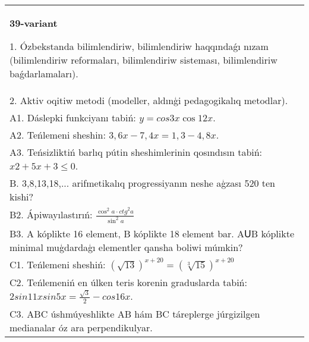 \documentclass{article}
\begin{document}
\begin{tabular}{m{17cm}}
\textbf{39-variant}

1. Ózbekstanda bilimlendiriw, bilimlendiriw haqqındaǵı nızam (bilimlendiriw reformaları, bilimlendiriw sisteması, bilimlendiriw baǵdarlamaları). \\
2. Aktiv oqitiw metodi (modeller, aldınģi pedagogikalıq metodlar). \\
A1. Dáslepki funkciyanı tabiń: \(y=cos{3x}\cos{12x}\). \\
A2. Teńlemeni sheshin: \(3,6x - 7,4x = 1,3 - 4,8x\). \\
A3. Teńsizliktiń barlıq pútin sheshimlerinin qosındısın tabiń: \(x2 + 5x + 3 \leq 0\). \\
B. 3,8,13,18,... arifmetikalıq progressiyanın neshe aģzası 520 ten kishi? \\
B2. Ápiwayılastırıń: \(\frac{\cos^{2}a \cdot {ctg}^{2}a}{\sin^{2}a}\) \\
B3. A kóplikte 16 element, B kóplikte 18 element bar. AՍB kóplikte minimal muģdardaģı elementler qansha boliwi múmkin? \\
C1. Teńlemeni sheshiń: \((\sqrt{13}) ^{x + 20} = (\sqrt[3]{15}) ^{x + 20}\) \\
C2. Teńlemeniń en úlken teris korenin graduslarda tabiń: \(2sin11xsin5x = \frac{\sqrt{3}}{2} - cos16x\). \\
C3. ABC úshmúyeshlikte AB hám BC táreplerge júrgizilgen medianalar óz ara perpendikulyar. \\

\end{tabular}
\vspace{1cm}
\end{document}
